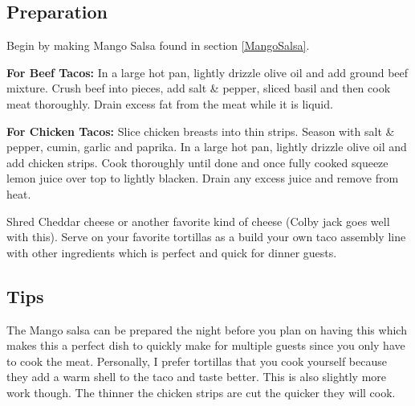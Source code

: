 \subsection*{Preparation}
Begin by making Mango Salsa found in section \ref{MangoSalsa}.

\textbf{For Beef Tacos:} In a large hot pan, lightly drizzle olive oil and add ground beef mixture. Crush beef into pieces, add salt \& pepper, sliced basil and then cook meat thoroughly. Drain excess fat from the meat while it is liquid. 

\textbf{For Chicken Tacos:} Slice chicken breasts into thin strips. Season with salt \& pepper, cumin, garlic and paprika. In a large hot pan, lightly drizzle olive oil and add chicken strips.  Cook thoroughly until done and once fully cooked squeeze lemon juice over top to lightly blacken. Drain any excess juice and remove from heat.

Shred Cheddar cheese or another favorite kind of cheese (Colby jack goes well with this). Serve on your favorite tortillas as a build your own taco assembly line with other ingredients which is perfect and quick for dinner guests.

\subsection*{Tips}

The Mango salsa can be prepared the night before you plan on having this which makes this a perfect dish to quickly make for multiple guests since you only have to cook the meat. Personally, I prefer tortillas that you cook yourself because they add a warm shell to the taco and taste better. This is also slightly more work though. The thinner the chicken strips are cut the quicker they will cook. 